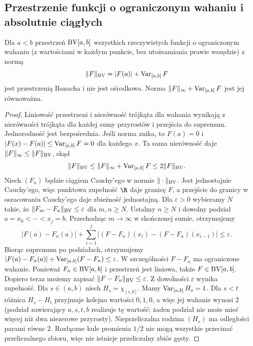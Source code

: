 \subsection{Przestrzenie funkcji o ograniczonym wahaniu i absolutnie ciągłych}

\begin{twierdzenie}
\label{ma1:thm:bv-banach}
Dla $a<b$ przestrzeń $\mathrm{BV}[a,b]$ wszystkich rzeczywistych
funkcji o ograniczonym wahaniu (z wartościami w każdym
punkcie, bez utożsamiania prawie wszędzie) z normą
\[
 \|F\|_{\mathrm{BV}}=|F(a)|+\operatorname{Var}_{[a,b]}F
\]
jest przestrzenią Banacha i nie jest ośrodkowa.
Norma $\|F\|_\infty+\operatorname{Var}_{[a,b]}F$ jest jej równoważna.
\end{twierdzenie}
\begin{proof}
Liniowość przestrzeni i nierówność trójkąta dla wahania
wynikają z nierówności trójkąta dla każdej sumy przyrostów
i przejścia do supremum. Jednorodność jest bezpośrednia.
Jeśli norma znika, to $F(a)=0$ i
$|F(x)-F(a)|\le\operatorname{Var}_{[a,b]}F=0$ dla każdego $x$.
Ta sama nierówność daje $\|F\|_\infty\le\|F\|_{\mathrm{BV}}$,
skąd
\[
 \|F\|_{\mathrm{BV}}\le\|F\|_\infty+\operatorname{Var}_{[a,b]}F
 \le 2\|F\|_{\mathrm{BV}}.
\]
Niech $(F_n)$ będzie ciągiem Cauchy'ego w normie
$\|\cdot\|_{\mathrm{BV}}$. Jest jednostajnie Cauchy'ego,
więc punktowa zupełność $\R$ daje granicę $F$,
a przejście do granicy w oszacowaniu Cauchy'ego
daje zbieżność jednostajną.
Dla $\varepsilon>0$ wybieramy $N$ takie, że
$\|F_m-F_n\|_{\mathrm{BV}}\le\varepsilon$ dla $m,n\ge N$.
Ustalmy $n\ge N$ i dowolny podział $a=x_0<\cdots<x_j=b$.
Przechodząc $m\to\infty$ w skończonej sumie, otrzymujemy
\[
 |F(a)-F_n(a)|+
 \sum_{i=1}^{j}|(F-F_n)(x_i)-(F-F_n)(x_{i-1})|
 \le\varepsilon .
\]
Biorąc supremum po podziałach, otrzymujemy
$|F(a)-F_n(a)|+\operatorname{Var}_{[a,b]}(F-F_n)\le\varepsilon$.
W szczególności $F-F_n$ ma ograniczone wahanie.
Ponieważ $F_n\in\mathrm{BV}[a,b]$ i przestrzeń jest liniowa,
także $F\in\mathrm{BV}[a,b]$. Dopiero teraz możemy zapisać
$\|F-F_n\|_{\mathrm{BV}}\le\varepsilon$.
Z dowolności $\varepsilon$ wynika zupełność.
Dla $s\in(a,b)$ niech $H_s=\chi_{[s,b]}$.
Mamy $\operatorname{Var}_{[a,b]}H_s=1$. Dla $s<t$ różnica
$H_s-H_t$ przyjmuje kolejno wartości $0,1,0$,
a więc jej wahanie wynosi $2$ (podział zawierający
$a,s,t,b$ realizuje tę wartość; żaden podział nie
może mieć więcej niż dwa niezerowe przyrosty).
Nieprzeliczalna rodzina $(H_s)$ ma odległości
parami równe $2$. Rozłączne kule promienia $1/2$
nie mogą wszystkie przecinać przeliczalnego zbioru,
więc nie istnieje przeliczalny zbiór gęsty.
\end{proof}

